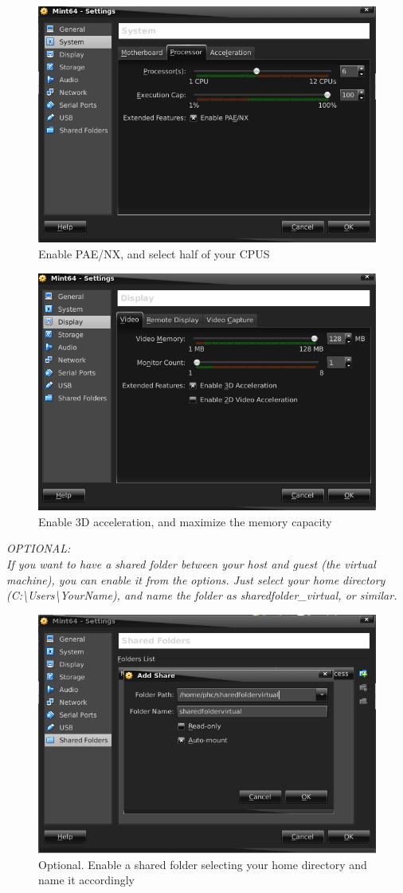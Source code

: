 \documentclass[a4paper]{article}
\begin{document}
\begin{figure}[H]
    \centering
    \includegraphics[width=0.5\linewidth]{VB_settings_processor.png}
    \caption{Enable PAE/NX, and select half of your CPUS}
    \label{fig:VB_settings_processor}
\end{figure}
\begin{figure}[H]
    \centering
    \includegraphics[width=0.5\linewidth]{VB_settings_video.png}
    \caption{Enable 3D acceleration, and maximize the memory capacity}
    \label{fig:VB_settings_video}
\end{figure}
\noindent
\textit{OPTIONAL:\\
If you want to have a shared folder between your host and guest (the virtual machine), you can enable it from the options. Just select your home directory (C:\textbackslash Users\textbackslash YourName), and name the folder as sharedfolder\_virtual, or similar.}
\begin{figure}[H]
    \centering
    \includegraphics[width=0.5\linewidth]{VB_settings_sharedfolder.png}
    \caption{Optional. Enable a shared folder selecting your home directory and name it accordingly}
    \label{fig:VB_settings_sharedfolder}
\end{figure}
\end{document}
